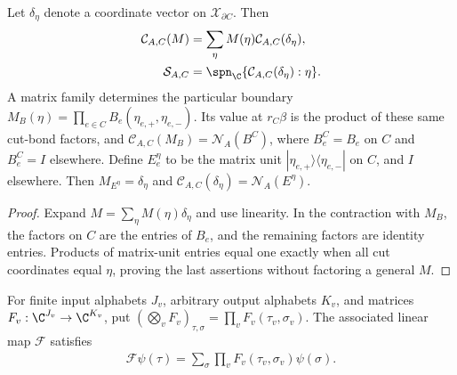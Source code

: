 \begin{lemma}%
    \label{thm:peps_dependent_cut_basis}
    \leanok
    Let $\delta_\eta$ denote a coordinate vector on $\mathcal X_{\partial C}$.
    Then
    \begin{align}
        \mathcal C_{A,C}(M) & =\sum_\eta M(\eta)\mathcal C_{A,C}(\delta_\eta),
        \label{eq:peps_dependent_cut_basis}                                     \\
        \mathcal S_{A,C}    & =\spn_{\C}\{\mathcal C_{A,C}(\delta_\eta):\eta\}.
        \nonumber
    \end{align}
    A matrix family determines the particular boundary
    $M_B(\eta)=\prod_{e\in C}B_e(\eta_{e,+},\eta_{e,-})$.
    Its value at $r_C\beta$ is the product of these same cut-bond factors,
    and $\mathcal C_{A,C}(M_B)=\mathcal N_A(B^C)$, where $B^C_e=B_e$ on
    $C$ and $B^C_e=I$ elsewhere. Define $E^\eta_e$ to be the matrix unit
    $|\eta_{e,+}\rangle\langle\eta_{e,-}|$ on $C$, and $I$ elsewhere.
    Then $M_{E^\eta}=\delta_\eta$ and
    $\mathcal C_{A,C}(\delta_\eta)=\mathcal N_A(E^\eta)$.
\end{lemma}
\begin{proof}\leanok
    Expand $M=\sum_\eta M(\eta)\delta_\eta$ and use linearity.
    In the contraction with $M_B$, the factors on $C$ are the entries of
    $B_e$, and the remaining factors are identity entries. Products of
    matrix-unit entries equal one exactly when all cut coordinates equal
    $\eta$, proving the last assertions without factoring a general $M$.
\end{proof}

\begin{definition}%
    \label{def:peps_dependent_physical_product}
    \leanok
    For finite input alphabets $J_v$, arbitrary output alphabets $K_v$, and
    matrices $F_v: \C^{J_v}\to\C^{K_v}$, put
    $(\bigotimes_v F_v)_{\tau,\sigma}=\prod_v F_v(\tau_v,\sigma_v)$.
    The associated linear map $\mathcal F$ satisfies
    \begin{align}
        \mathcal F\psi(\tau)=\sum_\sigma\prod_vF_v(\tau_v,\sigma_v)\psi(\sigma).
        \label{eq:peps_dependent_physical_product}
    \end{align}
\end{definition}


